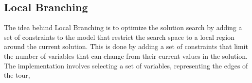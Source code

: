 \documentclass{article}
\begin{document}
\subsection{Local Branching}
The idea behind Local Branching is to optimize the solution search by adding a set of constraints to the model that restrict the search space to a local region around the current solution.
This is done by adding a set of constraints that limit the number of variables that can change from their current values in the solution.
The implementation involves selecting a set of variables, representing the edges of the tour, 




\newpage





\end{document}
